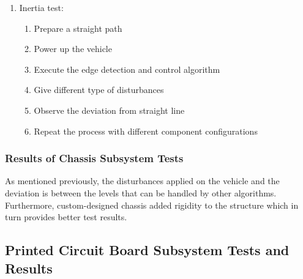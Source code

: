\documentclass[a4paper,12pt]{article}
\begin{document}
\begin{enumerate}

\item Inertia test: 

\begin{enumerate}

\item Prepare a straight path

\item Power up the vehicle 

\item Execute the edge detection and control algorithm

\item Give different type of disturbances 

\item Observe the deviation from straight line

\item Repeat the process with different component configurations

\end{enumerate} 

\end{enumerate}


\subsubsection*{Results of Chassis Subsystem Tests}

As mentioned previously, the disturbances applied on the vehicle and the deviation is between the levels that can be handled by other algorithms. Furthermore, custom-designed chassis added rigidity to the structure which in turn provides better test results.






\subsection {Printed Circuit Board Subsystem Tests and Results}
	
\end{document}
